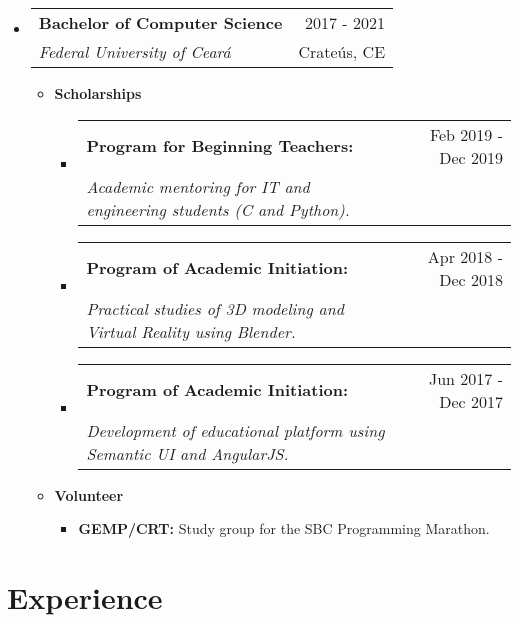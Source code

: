 \documentclass[letterpaper,11pt]{article}
\makeatletter
\newcommand{\resumeSubheading}[4]{
    \vspace{-1pt}\item
        \begin{tabular*}{0.97\textwidth}{l@{\extracolsep{\fill}}r}
            \textbf{#1} & #2 \\
            \textit{\small#3} & \small #4 \\
        \end{tabular*}
    \vspace{-5pt}
}
\newcommand{\resumeScholarship}[4]{
    \vspace{-1pt}\item
        \begin{tabular*}{0.89\textwidth}{l@{\extracolsep{\fill}}r}
            \textbf{\small#1} & #2 \\
            \textit{\small#3} & \small #4 \\
        \end{tabular*}\vspace{-5pt}
    \vspace{0.3cm}
}
\newcommand{\resumeSubHeadingListStart}{\begin{itemize}[leftmargin=*]}
\newcommand{\resumeSubHeadingListEnd}{\end{itemize}}
\makeatother
\begin{document}
    \resumeSubHeadingListStart
        \resumeSubheading
        {Bachelor of Computer Science}{\faCalendar \hspace{0.1cm} 2017 - 2021}
        {Federal University of Ceará}{\faMapMarker \hspace{0.1cm} Crateús, CE}
        \begin{itemize}
            \item \textbf{Scholarships}
                \begin{itemize}
                    \resumeScholarship
                    {Program for Beginning Teachers:}{\faCalendar \hspace{0.1cm} \small Feb 2019 - Dec 2019}
                    {Academic mentoring for IT and engineering students (C and Python).}{}
            
                    \resumeScholarship
                    {Program of Academic Initiation:}{\faCalendar \hspace{0.1cm} \small Apr 2018 - Dec 2018}
                    {Practical studies of 3D modeling and Virtual Reality using Blender.}{}
        
                    \resumeScholarship
                    {Program of Academic Initiation:}{\faCalendar \hspace{0.1cm} \small Jun 2017 - Dec 2017}
                    {Development of educational platform using Semantic UI and AngularJS.}{}
                \end{itemize}
        \end{itemize}
      
        \begin{itemize}
            \item \textbf{Volunteer}
                \begin{itemize}
                    \item \textbf{GEMP/CRT:} Study group for the SBC Programming Marathon. \href{https://github.com/GEMP-UFC-Crateus}{\scriptsize \faExternalLink}
                \end{itemize}
        \end{itemize}
        
        \vspace{0.01cm} %
    \resumeSubHeadingListEnd

\section{\faBriefcase \hspace{0.2cm} \Large Experience}
\end{document}
